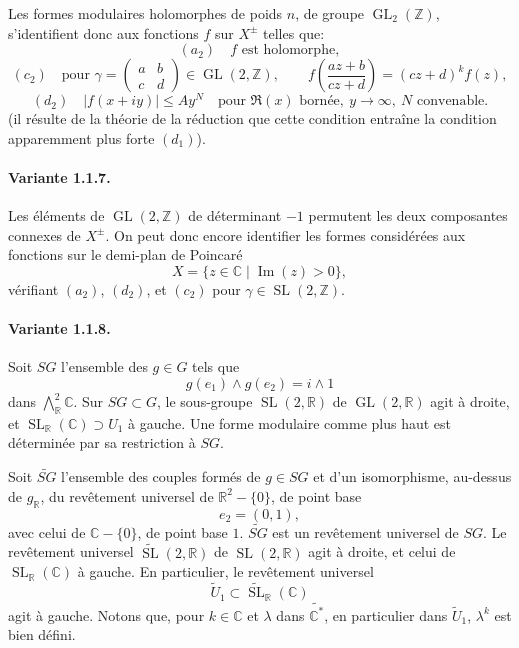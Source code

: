 \documentclass[10pt,a4paper]{article}
\providecommand{\GL}{\operatorname{GL}}
\providecommand{\SL}{\operatorname{SL}}
\providecommand{\R}{\mathbb R}
\providecommand{\Z}{\mathbb Z}
\providecommand{\C}{\mathbb C}
\begin{document}
Les formes modulaires holomorphes de poids \(n\), de groupe \(\GL_2(\Z)\), s'identifient donc aux fonctions \(f\) sur \(X^\pm\) telles que:
\[
(a_2)\quad f\text{ est holomorphe},
\]
\[
(c_2)\quad
\text{pour }\gamma=\begin{pmatrix}a&b\\ c&d\end{pmatrix}\in\GL(2,\Z),\qquad
f\!\left(\frac{az+b}{cz+d}\right)=(cz+d)^k f(z),
\]
\[
(d_2)\quad
|f(x+iy)|\le Ay^N
\quad\text{pour }\Re(x)\text{ bornée},\ y\to\infty,\ N\text{ convenable}.
\]
(il résulte de la théorie de la réduction que cette condition entraîne la condition apparemment plus forte \((d_1)\)).

\paragraph{Variante 1.1.7.} Les éléments de \(\GL(2,\Z)\) de déterminant \(-1\) permutent les deux composantes connexes de \(X^\pm\). On peut donc encore identifier les formes considérées aux fonctions sur le demi-plan de Poincaré
\[
X=\{z\in\C\mid \operatorname{Im}(z)>0\},
\]
vérifiant \((a_2)\), \((d_2)\), et \((c_2)\) pour \(\gamma\in\SL(2,\Z)\).

\paragraph{Variante 1.1.8.} Soit \(SG\) l'ensemble des \(g\in G\) tels que
\[
g(e_1)\wedge g(e_2)=i\wedge1
\]
dans \(\bigwedge^2_{\R}\C\). Sur \(SG\subset G\), le sous-groupe \(\SL(2,\R)\) de \(\GL(2,\R)\) agit à droite, et \(\SL_{\R}(\C)\supset U_1\) à gauche. Une forme modulaire comme plus haut est déterminée par sa restriction à \(SG\).

\clearpage
{}
\hypertarget{authority-15}{}
Soit \(\widetilde{SG}\) l'ensemble des couples formés de \(g\in SG\) et d'un isomorphisme, au-dessus de \(g_{\R}\), du revêtement universel de \(\R^2-\{0\}\), de point base
\[
e_2=(0,1),
\]
avec celui de \(\C-\{0\}\), de point base \(1\). \(\widetilde{SG}\) est un revêtement universel de \(SG\). Le revêtement universel \(\widetilde{\SL}(2,\R)\) de \(\SL(2,\R)\) agit à droite, et celui de \(\SL_{\R}(\C)\) à gauche. En particulier, le revêtement universel
\[
\widetilde U_1\subset\widetilde{\SL}_{\R}(\C)
\]
agit à gauche. Notons que, pour \(k\in\C\) et \(\lambda\) dans \(\widetilde{\C^*}\), en particulier dans \(\widetilde U_1\), \(\lambda^k\) est bien défini.
\end{document}
